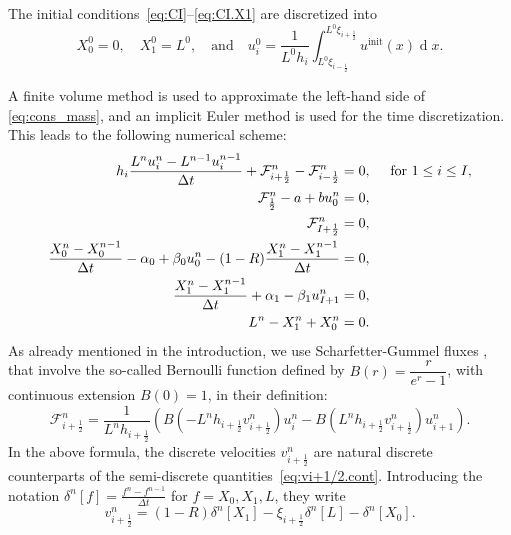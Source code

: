 \documentclass{amsart}
\newcommand\dd{{\operatorname{d}}}
\newcommand\dt{\Delta t}
\newcommand\Fluxnum[1]{\mathcal{F}_{#1 \frac{1}{2}}^n}
\newcommand\h[1]{h_{#1 \frac{1}{2}}}
\renewcommand\v[2]{v_{#1 \frac{1}{2}}^{#2}}
\newcommand\Bern[3]{B\left(#3 L^n \h{#1}{} \v{#1}{#2}\right)}
\begin{document}
The initial conditions~\eqref{eq:CI}--\eqref{eq:CI.X1} are discretized into 
\begin{equation}\label{eq:u0.disc}
X_0^0 = 0, \quad X_1^0 = L^0, \quad\text{and}\quad  u_{i}^0 = \frac{1}{L^0 h_i}\int_{L^0\xi_{i-\frac12}}^{L^0\xi_{i+\frac12}} u^\text{init}(x) \dd x.
\end{equation} 

	A finite volume method is used to approximate the left-hand side of \eqref{eq:cons_mass}, and an implicit Euler method is used for the time discretization. 
	This leads to the following numerical scheme:
\begin{subequations} \label{eq:scheme}
\begin{align}
	\label{eq:scheme_u}
		h_i \frac{L^n u_i^n - L^{n-1} u_i^{n-1}}{\dt} + \Fluxnum{i+} - \Fluxnum{i-} &= 0, \quad \textnormal{ for } 1 \leq i \leq I, \\
	\label{eq:left_cond_flux}
		\Fluxnum{} - a + bu_0^n &= 0, \\
	\label{eq:right_cond_flux}
		\Fluxnum{I+} &= 0, \\
	\label{eq:X0}
	\frac{X_0^n - X_0^{n-1}}{\dt} - \alpha_0 + \beta_0 u_0^{n} - (1-R) \frac{X_1^n - X_1^{n-1}}{\dt} &= 0, \\
	\label{eq:X1}
		\frac{X_1^n - X_1^{n-1}}{\dt} + \alpha_1 - \beta_1 u_{I+1}^{n} &= 0, \\
		L^n - X_1^n + X_0^n &= 0.\label{eq:L}
\end{align}
\end{subequations}
As already mentioned in the introduction, we use Scharfetter-Gummel fluxes \cite{ScharfGumm}, that involve the 
so-called Bernoulli function defined by 
\(B(r) = \dfrac{r}{e^r-1}\), with continuous extension \(B(0) = 1\), in their definition:
	\begin{equation} \label{eq:def_flux_num}
		\Fluxnum{i+} = \frac{1}{L^n\h{i+}} \left( \Bern{i+}{n}{-} u_i^n - \Bern{i+}{n}{} u_{i+1}^n \right).
	\end{equation}
	In the above formula, the discrete velocities $\v{i+}{n}$ are natural discrete counterparts of the semi-discrete quantities~\eqref{eq:vi+1/2.cont}. Introducing the notation $\delta^n[f]=\frac{f^n-f^{n-1}}{\dt}$ for $f=X_0, X_1, L$, they write  
	\begin{equation}
	    \label{eq:def_v}
		\v{i+}{n} = (1-R) \delta^n [X_1] - \xi_{i+\frac{1}{2}} \delta^n [L] - \delta^n [X_0].
	\end{equation} 
	
\end{document}
